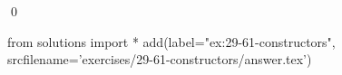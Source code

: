 
\begin{ex}
  \label{ex:29-61-constructors}
  
  \qed
\end{ex}
\begin{python0}
from solutions import *
add(label="ex:29-61-constructors",
    srcfilename='exercises/29-61-constructors/answer.tex')
\end{python0}
